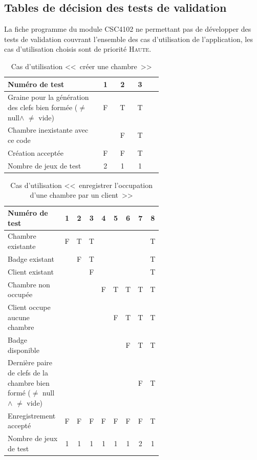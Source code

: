 \documentclass[11pt,article]{article}
\newcommand{\nullvalue}{\textsf{null}\xspace}
\begin{document}
\subsection{Tables de décision des tests de validation}

La fiche programme du module CSC4102 ne permettant pas de développer
des tests de validation couvrant l'ensemble des cas d'utilisation de
l'application, les cas d'utilisation choisis sont de priorité
\textsc{Haute}.

\begin{table}[htbp!]
\begin{tabular}{|p{0.6\linewidth}|c|c|c|c|}
\hline
Numéro de test
&1&2&3\\
\hline

\hline
Graine pour la génération des clefs bien formée ($\neq$ \nullvalue $\land$ $\neq$ vide)
&F&T&T\\
\hline
Chambre inexistante avec ce code
& &F&T\\
\hline
\hline
Création acceptée
&F&F&T\\
\hline
\hline
Nombre de jeux de test
&2&1&1\\
\hline
\end{tabular}
\caption{Cas d'utilisation <<~créer une chambre~>>}
\end{table}
        \begin{table}[htbp!]
            \begin{tabular}{|p{0.6\linewidth}|c|c|c|c|c|c|c|c|}
                \hline
                Numéro de test
                    &1&2&3&4&5&6&7&8\\

                \hline
                Chambre existante
                    &F&T&T& & & & &T\\
                \hline
                Badge existant
                    & &F&T& & & & &T\\
				\hline
                Client existant
                    & & &F& & & & &T\\
                \hline
                \hline
                Chambre non occupée
                    & & & &F&T&T&T&T\\
                \hline
				\hline
				Client occupe aucune chambre
					& & & & &F&T&T&T\\
				\hline
				\hline
				Badge disponible
					& & & & & &F&T&T\\
				\hline
				\hline
                Dernière paire de clefs de la chambre bien formé ($\neq$ \nullvalue $\land$ $\neq$ vide)
                    & & & & & & &F&T\\
                \hline
                \hline
                Enregistrement accepté
                    &F&F&F&F&F&F&F&T\\
                \hline
                \hline
                Nombre de jeux de test
                                    &1&1&1&1&1&1&2&1\\
                \hline
            \end{tabular}
            \caption{Cas d'utilisation <<~enregistrer l'occupation d'une chambre par un client~>>}
        \end{table}
\end{document}
